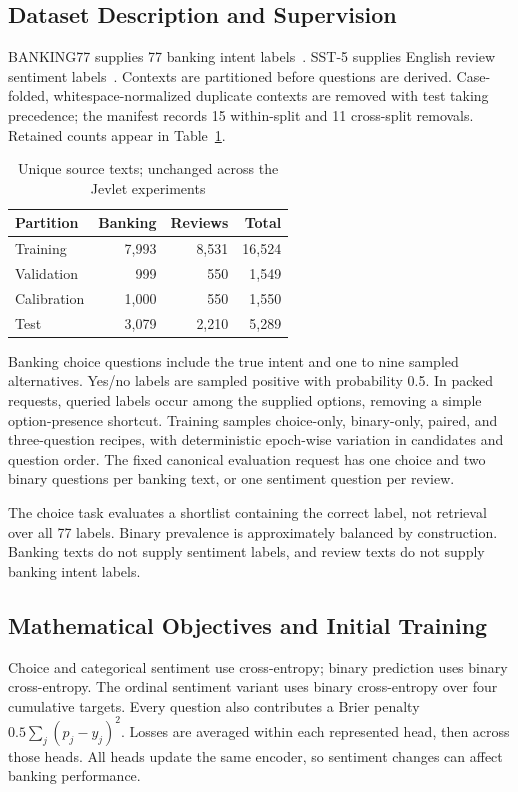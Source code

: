 \documentclass[conference]{IEEEtran}
\begin{document}
\subsection{Dataset Description and Supervision}
BANKING77 supplies 77 banking intent labels~\cite{banking}. SST-5 supplies English review sentiment labels~\cite{sst}. Contexts are partitioned before questions are derived. Case-folded, whitespace-normalized duplicate contexts are removed with test taking precedence; the manifest records 15 within-split and 11 cross-split removals. Retained counts appear in Table~\ref{tab:data}.

\begin{table}[t]
\caption{Unique source texts; unchanged across the Jevlet experiments}
\label{tab:data}\centering
\begin{tabular}{lrrr}\toprule
Partition & Banking & Reviews & Total\\\midrule
Training & 7,993 & 8,531 & 16,524\\
Validation & 999 & 550 & 1,549\\
Calibration & 1,000 & 550 & 1,550\\
Test & 3,079 & 2,210 & 5,289\\\bottomrule
\end{tabular}\end{table}

Banking choice questions include the true intent and one to nine sampled alternatives. Yes/no labels are sampled positive with probability 0.5. In packed requests, queried labels occur among the supplied options, removing a simple option-presence shortcut. Training samples choice-only, binary-only, paired, and three-question recipes, with deterministic epoch-wise variation in candidates and question order. The fixed canonical evaluation request has one choice and two binary questions per banking text, or one sentiment question per review.

The choice task evaluates a shortlist containing the correct label, not retrieval over all 77 labels. Binary prevalence is approximately balanced by construction. Banking texts do not supply sentiment labels, and review texts do not supply banking intent labels.

\subsection{Mathematical Objectives and Initial Training}
Choice and categorical sentiment use cross-entropy; binary prediction uses binary cross-entropy. The ordinal sentiment variant uses binary cross-entropy over four cumulative targets. Every question also contributes a Brier penalty $0.5\sum_j(p_j-y_j)^2$. Losses are averaged within each represented head, then across those heads. All heads update the same encoder, so sentiment changes can affect banking performance.
\end{document}
